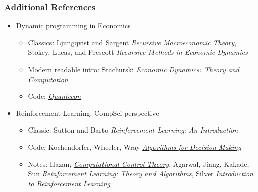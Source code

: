\documentclass[bigger,handout]{beamer}
\begin{document}
\begin{frame}%

\frametitle{Additional References}

\begin{itemize}
\item Dynamic programming in Economics
\begin{itemize}
\item Classics: Ljungqvist and Sargent \emph{Recursive Macroeconomic Theory}, Stokey, Lucas, and Prescott \emph{Recursive Methods in Economic Dynamics}
\item Modern readable intro: Stachurski \emph{Economic Dynamics: Theory and Computation}
\item Code: \href{https://julia.quantecon.org/}{\emph{Quantecon}}
\end{itemize}

\item Reinforcement Learning: CompSci perspective
\begin{itemize}
\item Classic: Sutton and Barto \emph{Reinforcement Learning: An Introduction}
\item Code: Kochendorfer, Wheeler, Wray \href{https://algorithmsbook.com/}{\emph{Algorithms for Decision Making}}
\item Notes: Hazan, \href{https://sites.google.com/view/cos59x-cct/home}{\emph{Computational Control Theory}}, Agarwal, Jiang, Kakade, Sun \href{https://rltheorybook.github.io/}{\emph{Reinforcement Learning: Theory and Algorithms}}, Silver \href{https://deepmind.com/learning-resources/-introduction-reinforcement-learning-david-silver}{\emph{Introduction to Reinforcement Learning}} 
\end{itemize}


\end{itemize}

\end{frame}%
\end{document}
